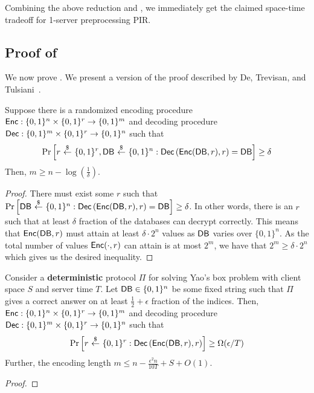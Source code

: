 Combining the above reduction and 
, we immediately get the claimed space-time
tradeoff for 1-server preprocessing PIR. 






\subsection{Proof of } 
\label{sec:prob-yao}
We now prove . 
We present a version of the proof described by De, Trevisan, 
and Tulsiani~\cite{DTT10}. 


\begin{fact}
Suppose there is a randomized encoding procedure
${\sf Enc}: \{0, 1\}^n \times \{0, 1\}^r \rightarrow \{0, 1\}^m$
and decoding procedure 
${\sf Dec}: \{0, 1\}^m \times \{0, 1\}^r \rightarrow \{0, 1\}^n$
such that 
\[
\Pr\left[
r~{\overset{\$}{\leftarrow}}~\{0, 1\}^r, {\sf DB} ~{\overset{\$}{\leftarrow}}~ \{0, 1\}^n:
{\sf Dec}\left({\sf Enc}({\sf DB}, r), r\right)
= {\sf DB}
\right]
\geq \delta
\]
Then, $m \geq n - \log(\frac{1}{\delta})$.
\end{fact}
\begin{proof}
There must exist some $r$ such that 
$\Pr\left[{\sf DB} ~{\overset{\$}{\leftarrow}}~ \{0, 1\}^n:
{\sf Dec}\left({\sf Enc}({\sf DB}, r), r\right)
= {\sf DB}
\right]\geq \delta$.
In other words, there is an $r$ such that at least $\delta$ 
fraction of the databases can decrypt correctly.
This means that ${\sf Enc}({\sf DB}, r)$
must attain at least 
$\delta \cdot 2^n$ values 
as ${\sf DB}$ varies over $\{0, 1\}^n$.
As the total number of values ${\sf Enc}(\cdot, r)$ can attain
is at most $2^m$, we have that 
$2^m \geq \delta \cdot 2^n$ which gives us the desired
inequality.
\end{proof}

\begin{lemma}
Consider a {\bf deterministic}
protocol $\Pi$ for solving Yao's box problem with 
client space $S$ and server time $T$. 
Let ${\sf DB} \in \{0, 1\}^n$ be some fixed string 
such that 
$\Pi$ gives a correct answer
on  
at least $\frac{1}{2} + \epsilon$ 
fraction of the indices.
Then, 
${\sf Enc}: \{0, 1\}^n \times \{0, 1\}^r \rightarrow \{0, 1\}^m$
and decoding procedure
${\sf Dec}: \{0, 1\}^m \times \{0, 1\}^r \rightarrow \{0, 1\}^n$
such that
\[
\Pr\left[r ~{\overset{\$}{\leftarrow}}~ \{0, 1\}^r: 
{\sf Dec}\left({\sf Enc}({\sf DB}, r), r\right) 
\right]
\geq 
\Omega(\epsilon/T)
\]
Further, the encoding length 
$m \leq n - \frac{\epsilon^2 n}{10T} + S + O(1)$.
\end{lemma}
\begin{proof}
\end{proof}


